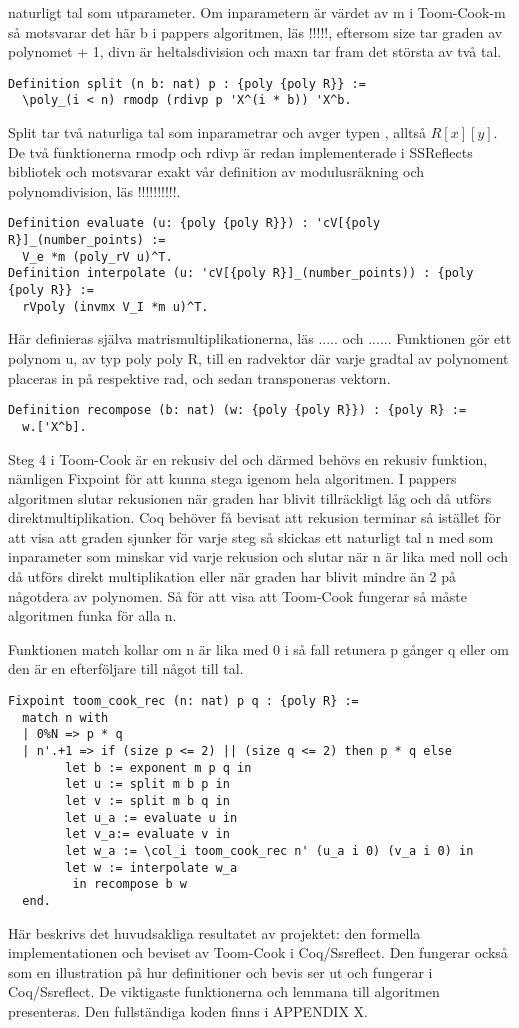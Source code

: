 naturligt tal som utparameter. Om inparametern är värdet av m i Toom-Cook-m så
motsvarar det här b i pappers algoritmen, läs !!!!!, eftersom size tar graden
av polynomet + 1, divn är heltalsdivision och maxn tar fram det största av två
tal.
\begin{lstlisting}
Definition split (n b: nat) p : {poly {poly R}} :=
  \poly_(i < n) rmodp (rdivp p 'X^(i * b)) 'X^b.
\end{lstlisting}
Split tar två naturliga tal som inparametrar och avger typen , alltså $R[x][y]$. De två funktionerna rmodp och rdivp är redan
implementerade i SSReflects bibliotek och motsvarar exakt vår definition av
modulusräkning och polynomdivision, läs !!!!!!!!!!.
\begin{lstlisting}
Definition evaluate (u: {poly {poly R}}) : 'cV[{poly R}]_(number_points) :=
  V_e *m (poly_rV u)^T.
Definition interpolate (u: 'cV[{poly R}]_(number_points)) : {poly {poly R}} :=
  rVpoly (invmx V_I *m u)^T.
\end{lstlisting}
Här definieras själva matrismultiplikationerna, läs ..... och ...... Funktionen
 gör ett polynom u, av typ poly poly R, till en radvektor där varje
gradtal av polynoment placeras in på respektive rad, och sedan transponeras
vektorn.
\begin{lstlisting}
Definition recompose (b: nat) (w: {poly {poly R}}) : {poly R} :=
  w.['X^b].
\end{lstlisting}
Steg 4 i Toom-Cook är en rekusiv del och därmed behövs en rekusiv funktion,
nämligen Fixpoint för att kunna stega igenom hela algoritmen. I pappers
algoritmen slutar rekusionen när graden har blivit tillräckligt låg och då
utförs direktmultiplikation. Coq behöver få bevisat att rekusion terminar så
istället för att visa att graden sjunker för varje steg så skickas ett
naturligt tal n med som inparameter som minskar vid varje rekusion och slutar
när n är lika med noll och då utförs direkt multiplikation eller när graden har
blivit mindre än 2 på någotdera av polynomen. Så för att visa att Toom-Cook
fungerar så måste algoritmen funka för alla n.

Funktionen match kollar om n är lika med 0 i så fall retunera p gånger q eller
om den är en efterföljare till något till tal.
\begin{lstlisting}
Fixpoint toom_cook_rec (n: nat) p q : {poly R} :=
  match n with
  | 0%N => p * q
  | n'.+1 => if (size p <= 2) || (size q <= 2) then p * q else
        let b := exponent m p q in
        let u := split m b p in
        let v := split m b q in
        let u_a := evaluate u in
        let v_a:= evaluate v in
        let w_a := \col_i toom_cook_rec n' (u_a i 0) (v_a i 0) in
        let w := interpolate w_a
         in recompose b w
  end.
\end{lstlisting}
Här beskrivs det huvudsakliga resultatet av projektet: den formella
implementationen och beviset av Toom-Cook i Coq/Ssreflect. Den fungerar också
som en illustration på hur definitioner och bevis ser ut och fungerar i
Coq/Ssreflect. De viktigaste funktionerna och lemmana till algoritmen
presenteras. Den fullständiga koden finns i APPENDIX X.

